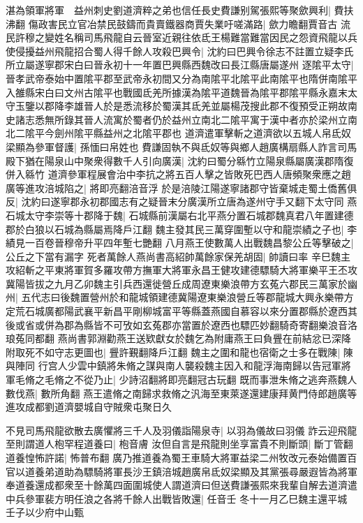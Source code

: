 湛為領軍將軍　益州刺史劉道濟粹之弟也信任長史費謙别駕張熙等聚歛興利|{
	費扶沸翻}
傷政害民立官冶禁民鼓鑄而貴賣鐵器商賈失業吁嗟滿路|{
	歛力瞻翻賈音古}
流民許穆之變姓名稱司馬飛龍自云晉室近親往依氐王楊難當難當因民之怨資飛龍以兵使侵擾益州飛龍招合蜀人得千餘人攻殺巴興令|{
	沈約曰巴興令徐志不註置立疑李氏所立屬遂寧郡宋白曰晉永初十一年置巴興縣西魏改曰長江縣唐屬遂州}
逐隂平太守|{
	晉孝武帝泰始中置隂平郡至武帝永初間又分為南隂平北隂平此南隂平也隋併南隂平入雒縣宋白曰文州古隂平也戰國氐羌所據漢為隂平道魏晉為隂平郡隂平縣永嘉末太守玉鑒以郡降李雄晉人於是悉流移於蜀漢其氐羌並屬楊茂搜此郡不復預受正朔故南史諸志悉無所錄其晉人流寓於蜀者仍於益州立南北二隂平寓于漢中者亦於梁州立南北二隂平今劍州隂平縣益州之北隂平郡也}
道濟遣軍擊斬之道濟欲以五城人帛氐奴梁顯為參軍督護|{
	孫愐曰帛姓也}
費謙固執不與氐奴等與鄉人趙廣構扇縣人詐言司馬殿下猶在陽泉山中聚衆得數千人引向廣漢|{
	沈約曰蜀分緜竹立陽泉縣屬廣漢郡隋復併入緜竹}
道濟參軍程展會治中李抗之將五百人擊之皆敗死巴西人唐頻聚衆應之趙廣等進攻涪城陷之|{
	將即亮翻涪音浮}
於是涪陵江陽遂寧諸郡守皆棄城走蜀土僑舊俱反|{
	沈約曰遂寧郡永初郡國志有之疑晉末分廣漢所立唐為遂州守手又翻下太守同}
燕石城太守李崇等十郡降于魏|{
	石城縣前漢屬右北平燕分置石城郡魏真君八年置建德郡於白狼以石城為縣屬焉降戶江翻}
魏主發其民三萬穿圍塹以守和龍崇績之子也|{
	李績見一百卷晉穆帝升平四年塹七艷翻}
八月燕王使數萬人出戰魏昌黎公丘等擊破之|{
	公丘之下當有漏字}
死者萬餘人燕尚書高紹帥萬餘家保羌胡固|{
	帥讀曰率}
辛巳魏主攻紹斬之平東將軍賀多羅攻帶方撫軍大將軍永昌王健攻建德驃騎大將軍樂平王丕攻冀陽皆拔之九月乙卯魏主引兵西還徙營丘成周遼東樂浪帶方玄菟六郡民三萬家於幽州|{
	五代志曰後魏置營州於和龍城領建德冀陽遼東樂浪營丘等郡龍城大興永樂帶方定荒石城廣都陽武襄平新昌平剛柳城富平等縣蓋燕國自慕容以來分置郡縣於遼西其後或省或併為郡為縣皆不可攷如玄菟郡亦當置於遼西也驃匹妙翻騎奇寄翻樂浪音洛琅菟同都翻}
燕尚書郭淵勸燕王送欵獻女於魏乞為附庸燕王曰負舋在前結忿已深降附取死不如守志更圖也|{
	舋許覲翻降戶江翻}
魏主之圍和龍也宿衛之士多在戰陳|{
	陳與陣同}
行宫人少雲中鎮將朱脩之謀與南人襲殺魏主因入和龍浮海南歸以告冠軍將軍毛脩之毛脩之不從乃止|{
	少詩沼翻將即亮翻冠古玩翻}
既而事泄朱脩之逃奔燕魏人數伐燕|{
	數所角翻}
燕王遣脩之南歸求救脩之汎海至東萊遂還建康拜黄門侍郎趙廣等進攻成都劉道濟嬰城自守賊衆屯聚日久

不見司馬飛龍欲散去廣懼將三千人及羽儀詣陽泉寺|{
	以羽為儀故曰羽儀}
詐云迎飛龍至則謂道人枹罕程道養曰|{
	枹音膚}
汝但自言是飛龍則坐享富貴不則斷頭|{
	斷丁管翻}
道養惶怖許諾|{
	怖普布翻}
廣乃推道養為蜀王車騎大將軍益梁二州牧改元泰始備置百官以道養弟道助為驃騎將軍長沙王鎮涪城趙廣帛氐奴梁顯及其黨張尋嚴遐皆為將軍奉道養還成都衆至十餘萬四面圍城使人謂道濟曰但送費謙張熙來我輩自解去道濟遣中兵參軍裴方明任浪之各將千餘人出戰皆敗還|{
	任音壬}
冬十一月乙巳魏主還平城　壬子以少府中山甄

